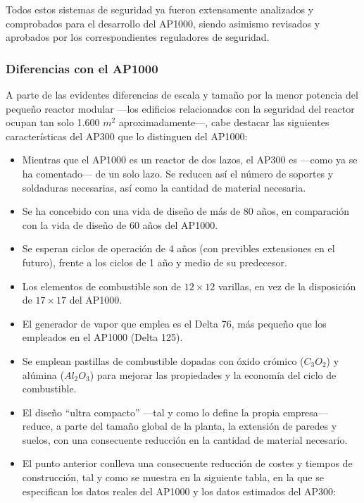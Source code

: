 Todos estos sistemas de seguridad ya fueron extensamente analizados y comprobados para el desarrollo del AP1000, siendo asimismo revisados y aprobados por los correspondientes reguladores de seguridad.


\subsubsection{Diferencias con el AP1000}

A parte de las evidentes diferencias de escala y tamaño por la menor potencia del pequeño reactor modular ---los edificios relacionados con la seguridad del reactor ocupan tan solo 1.600 $m^2$ aproximadamente---, cabe destacar las siguientes características del AP300 que lo distinguen del AP1000:

\begin{itemize}
  \item Mientras que el AP1000 es un reactor de dos lazos, el AP300 es ---como ya se ha comentado--- de un solo lazo. Se reducen así el número de soportes y soldaduras necesarias, así como la cantidad de material necesaria.
  \item Se ha concebido con una vida de diseño de más de 80 años, en comparación con la vida de diseño de 60 años del AP1000. 
  \item Se esperan ciclos de operación de 4 años (con previbles extensiones en el futuro), frente a los ciclos de 1 año y medio de su predecesor.
  \item Los elementos de combustible son de $12 \times  12$ varillas, en vez de la disposición de $17 \times 17$ del AP1000.
  \item El generador de vapor que emplea es el Delta 76, más pequeño que los empleados en el AP1000 (Delta 125).
  \item Se emplean pastillas de combustible dopadas con óxido crómico ($C_3O_2$) y alúmina ($Al_2O_3$) para mejorar las propiedades y la economía del ciclo de combustible.
  \item El diseño ``ultra compacto'' ---tal y como lo define la propia empresa--- reduce, a parte del tamaño global de la planta, la extensión de paredes y suelos, con una consecuente reducción en la cantidad de material necesario.
  \item El punto anterior conlleva una consecuente reducción de costes y tiempos de construcción, tal y como se muestra en la siguiente tabla, en la que se especifican los datos reales del AP1000 y los datos estimados del AP300:
\end{itemize}

